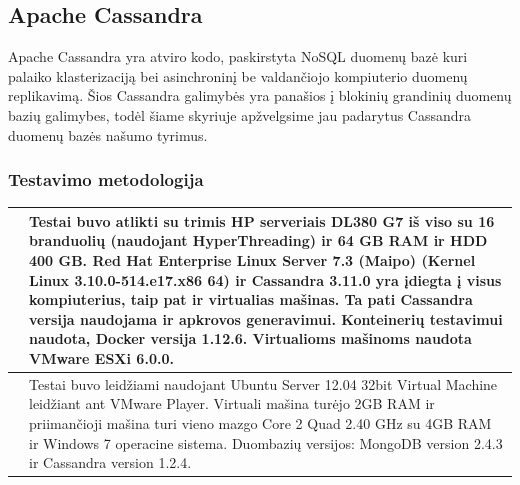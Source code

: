 \documentclass{VUMIFPSkursinis}
\begin{document}
			

	\subsection{Apache Cassandra}
	Apache Cassandra yra atviro kodo, paskirstyta NoSQL duomenų bazė kuri palaiko klasterizaciją bei asinchroninį be valdančiojo kompiuterio duomenų replikavimą. Šios Cassandra galimybės yra panašios į blokinių grandinių duomenų bazių galimybes, todėl šiame skyriuje apžvelgsime jau padarytus 
Cassandra duomenų bazės našumo tyrimus. 



	\subsubsection{Testavimo metodologija}
		\begin{center}
		\begin{tabular}{ | m{5em} | m{10cm}| } 
		\hline
		\cite{BITCass}& Testai buvo atlikti su trimis HP serveriais DL380
G7 iš viso su 16 branduolių (naudojant HyperThreading) ir 64 GB RAM ir HDD 400
GB. Red Hat Enterprise Linux Server 7.3 (Maipo) (Kernel
Linux 3.10.0-514.e17.x86 64) ir Cassandra 3.11.0 yra įdiegta į visus kompiuterius, taip pat ir virtualias mašinas. Ta pati Cassandra versija naudojama ir apkrovos generavimui. 
Konteinerių testavimui naudota,
Docker versija 1.12.6. Virtualioms mašinoms naudota VMware ESXi 6.0.0.\\ 
\hline
		\cite{BITCass}&  Testai buvo leidžiami naudojant
Ubuntu Server 12.04 32bit Virtual Machine leidžiant ant VMware Player.
 Virtuali mašina turėjo 2GB RAM ir priimančioji mašina turi vieno mazgo Core 2 Quad 2.40
GHz su 4GB RAM ir Windows 7 operacine sistema. Duombazių versijos: MongoDB version 2.4.3
ir Cassandra version 1.2.4. \\ 
		\hline
\end{tabular}
\end{center}
\end{document}
